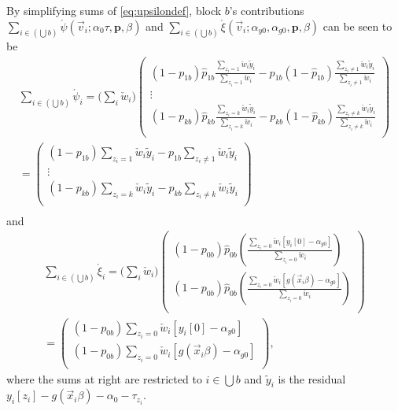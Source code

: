 \documentclass{article}
\newcommand{\owt}[1][{[z_{i}]}]{\ensuremath{\check{w}_{i#1}}}
\begin{document}
By simplifying sums of \eqref{eq:upsilondef},  block $b$'s contributions
$\sum_{i \in (\bigcup b)} \acute{\psi}(\vec{v}_{i};
\alpha_{0} \tau,
\mathbf{p}, \beta)$ and
$\sum_{i \in (\bigcup b)} \acute{\xi}(\vec{v}_{i};
\alpha_{y0}, \alpha_{g0}, \mathbf{p}, \beta)$ can be seen to be 
\begin{multline}
\sum_{i \in (\bigcup b)}\acute{\psi}_{i}=  \big(\sum_{i} \owt[]\big)
        \left(
          \begin{array}{c}
         {} (1-{p}_{1b})
            \hat{p}_{1b}\frac{\sum_{{z_i=1}}\owt[]\tilde{y}_{i}}{\sum_{{z_i=1}}\owt[]}  -
      p_{1b}(1-\hat{p}_{1b})\frac{\sum_{{z_i\neq
            1}}\owt[]\tilde{y}_{i}}{\sum_{{z_i\neq 1}}\owt[]}\\
      \vdots\\
         {}
            (1-{p}_{kb})\hat{p}_{kb}\frac{\sum_{{z_i=k}}\owt[]\tilde{y}_{i}}{\sum_{{z_i=k}}\owt[]}  -
      p_{kb}(1-\hat{p}_{kb})\frac{\sum_{{z_i\neq
            k}}\owt[]\tilde{y}_{i}}{\sum_{{z_i\neq k}}\owt[]} \\
          \end{array}
        \right)\\
= 
        \left(
          \begin{array}{c}
         {} (1-{p}_{1b})
            {\sum_{{z_i=1}}\owt[]\tilde{y}_{i}}  -
      p_{1b}{\sum_{{z_i\neq
            1}}\owt[]\tilde{y}_{i}}\\
      \vdots\\
         {}
            (1-{p}_{kb}){\sum_{{z_i=k}}\owt[]\tilde{y}_{i}}  -
      p_{kb}{\sum_{{z_i\neq
            k}}\owt[]\tilde{y}_{i}} \\
          \end{array}
        \right)\\
  \label{eq:31}
\end{multline}
and
\begin{multline}\label{eq:34}
\sum_{i \in (\bigcup b)}\acute{\xi}_{i}=  \big(\sum_{i} \owt[]\big)
\begin{pmatrix}
              (1-{p}_{0b})
            \hat{p}_{0b}\left(\frac{\sum_{{z_i=0}}\owt[][y_{i}[0] -\alpha_{y0}] }{\sum_{{z_i=0}}\owt[]}
            \right)\\
              (1-{p}_{0b})
            \hat{p}_{0b}\left(\frac{\sum_{{z_i=0}}\owt[][g(\vec{x}_{i}\beta)-\alpha_{g0}] }{\sum_{{z_i=0}}\owt[]}
            \right)\\
\end{pmatrix}\\
=
\begin{pmatrix}
              (1-{p}_{0b})
            {\sum_{{z_i=0}}\owt[] [y_{i}[0] -\alpha_{y0}]}
            \\
              (1-{p}_{0b})
            {\sum_{{z_i=0}}\owt[] [g(\vec{x}_{i}\beta)-\alpha_{g0}]}
  \\
\end{pmatrix},
\end{multline}
where the sums at right are restricted to $i \in \bigcup b$ and $\tilde{y}_{i}$ is the residual
$y_{i}[z_{i}] - g(\vec{x}_{i}\beta)-{\alpha}_{0}-\tau_{z_{i}}$.
\end{document}
